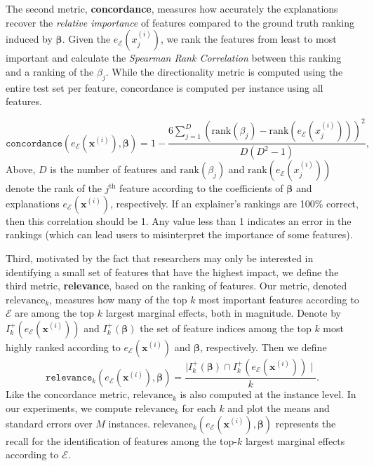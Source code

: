 \documentclass[12pt]{article}  %
\newcommand{\mE}{\mathcal{E}}
\begin{document}
      The second metric, \textbf{concordance}, measures how accurately the explanations recover the \textit{relative importance} of features compared to the ground truth ranking induced by $\boldsymbol{\beta}$. Given the $e_\mathcal{E}(x^{(i)}_j)$, we rank the features from least to most important and calculate the \emph{Spearman Rank Correlation} \citep{spearman1904proof} between this ranking and a ranking of the $\beta_j$. While the directionality metric is computed using the entire test set per feature, concordance is computed per instance using all features.

    \begin{equation}
       \texttt{concordance}(e_\mE(\mathbf{x}^{(i)}),\boldsymbol{\beta}) = 1 - \frac{6\sum_{j=1}^D (\text{rank}(\beta_j) - \text{rank}(e_\mE(x^{(i)}_j)))^2}{D(D^2-1)},
    \end{equation}
    Above, $D$ is the number of features and $\text{rank}(\beta_j)$ and $\text{rank}(e_\mE(x^{(i)}_j))$ denote the rank of the $j^{\text{th}}$ feature according to the coefficients of $\boldsymbol{\beta}$ and explanations $e_\mE(\mathbf{x}^{(i)})$, respectively. If an explainer's rankings are 100\% correct, then this correlation should be 1. Any value less than 1 indicates an error in the rankings (which can lead users to misinterpret the importance of some features).
    
Third, motivated by the fact that researchers may only be interested in identifying a small set of features that have the highest impact, we define the third metric, \textbf{relevance}, based on the ranking of features. Our metric, denoted $\text{relevance}_k$, measures how many of the top $k$ most important features according to $\mathcal{E}$  are among the top $k$ largest  marginal effects, both in magnitude. Denote by $I_k^+(e_\mE(\mathbf{x}^{(i)}))$ and $I_k^+(\boldsymbol{\beta})$  the set of feature indices among the top $k$ most highly ranked according to $e_\mE(\mathbf{x}^{(i)})$ and $\boldsymbol{\beta}$, respectively. Then we define 
    \begin{equation}
        \texttt{relevance}_k(e_\mE(\mathbf{x}^{(i)}), \boldsymbol{\beta}) = \frac{\mid I_k^+(\boldsymbol{\beta}) \cap I_k^+(e_\mE(\mathbf{x}^{(i)}))\mid}{k}.
    \end{equation}
     Like the concordance metric, $\text{relevance}_k$ is also computed at the instance level. 
    In our experiments, we compute $\text{relevance}_k$ for each $k$ and plot the means and standard errors over $M$ instances. $\text{relevance}_k(e_\mE(\mathbf{x}^{(i)}), \boldsymbol{\beta})$ represents the recall for the identification of features among the top-$k$ largest marginal effects according to $\mathcal{E}$.       
    
\end{document}
